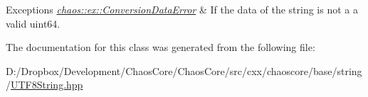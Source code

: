 \begin{DoxyExceptions}{Exceptions}
{\em \hyperlink{classchaos_1_1ex_1_1_conversion_data_error}{chaos\+::ex\+::\+Conversion\+Data\+Error}} & If the data of the string is not a a valid uint64. \\
\hline
\end{DoxyExceptions}


The documentation for this class was generated from the following file\+:\begin{DoxyCompactItemize}
\item 
D\+:/\+Dropbox/\+Development/\+Chaos\+Core/\+Chaos\+Core/src/cxx/chaoscore/base/string/\hyperlink{_u_t_f8_string_8hpp}{U\+T\+F8\+String.\+hpp}\end{DoxyCompactItemize}
